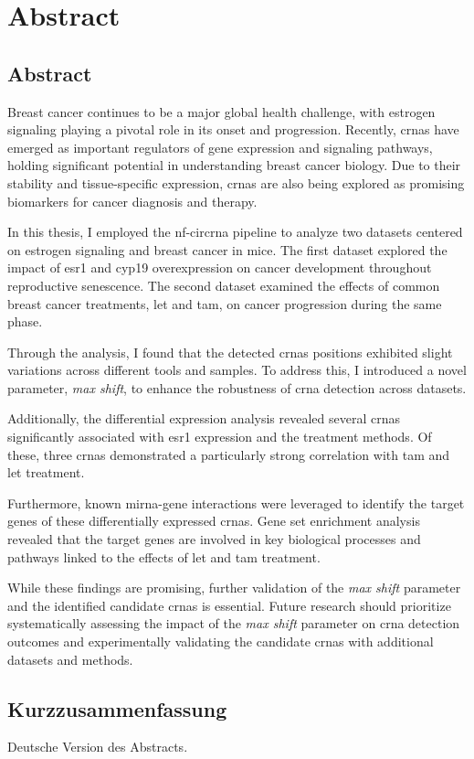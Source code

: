 \chapter{Abstract}

\section{Abstract}
Breast cancer continues to be a major global health challenge, with estrogen
signaling playing a pivotal role in its onset and progression.
Recently, \glspl{crna} have emerged as important regulators of gene expression
and signaling pathways, holding significant potential in understanding breast
cancer biology.
Due to their stability and tissue-specific expression, \glspl{crna} are also
being explored as promising biomarkers for cancer diagnosis and therapy.

In this thesis, I employed the \gls{nf-circrna} pipeline to analyze two
datasets centered on estrogen signaling and breast cancer in mice.
The first dataset explored the impact of \gls{esr1} and \gls{cyp19}
overexpression on cancer development throughout reproductive senescence.
The second dataset examined the effects of common breast cancer treatments,
\gls{let} and \gls{tam}, on cancer progression during the same phase.

Through the analysis, I found that the detected \glspl{crna} positions
exhibited slight variations across different tools and samples.
To address this, I introduced a novel parameter, \textit{max shift}, to enhance
the robustness of \gls{crna} detection across datasets.

Additionally, the differential expression analysis revealed several
\glspl{crna} significantly associated with \gls{esr1} expression and the
treatment methods.
Of these, three \glspl{crna} demonstrated a particularly strong correlation
with \gls{tam} and \gls{let} treatment.

Furthermore, known \gls{mirna}-gene interactions were leveraged to identify the
target genes of these differentially expressed \glspl{crna}.
Gene set enrichment analysis revealed that the target genes are involved in key
biological processes and pathways linked to the effects of \gls{let} and
\gls{tam} treatment.

While these findings are promising, further validation of the \textit{max
    shift} parameter and the identified candidate \glspl{crna} is essential.
Future research should prioritize systematically assessing the impact of the
\textit{max shift} parameter on \gls{crna} detection outcomes and
experimentally validating the candidate \glspl{crna} with additional datasets
and methods.

\section{Kurzzusammenfassung}

Deutsche Version des Abstracts.
